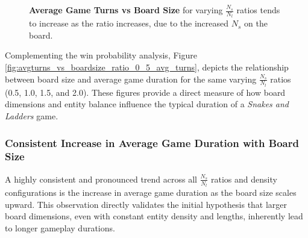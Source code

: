 \begin{figure}[th]
	\centering
	\linebreak
	\caption{\textbf{Average Game Turns vs Board Size }for varying $\frac{N_s}{N_l}$ ratios tends to increase as the ratio increases, due to the increased $N_s$ on the board.}
	\label{fig:avgturns_vs_nsnl_ratio}
\end{figure}


Complementing the win probability analysis, Figure \ref{fig:avgturns_vs_boardsize_ratio_0_5_avg_turns},  depicts the relationship between board size and average game duration for the same varying $\frac{N_s}{N_l}$ ratios (0.5, 1.0, 1.5, and 2.0).  These figures provide a direct measure of how board dimensions and entity balance influence the typical duration of a \textit{Snakes and Ladders} game.

\subsubsection{Consistent Increase in Average Game Duration with Board Size}  A highly consistent and pronounced trend across all $\frac{N_s}{N_l}$ ratios and density configurations is the increase in average game duration as the board size scales upward. This observation directly validates the initial hypothesis that larger board dimensions, even with constant entity density and lengths, inherently lead to longer gameplay durations. 

